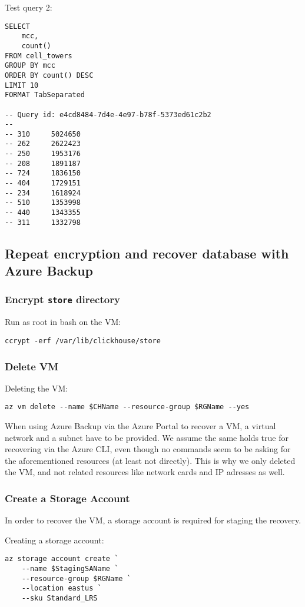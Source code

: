 Test query 2:
\begin{verbatim}
SELECT
    mcc,
    count()
FROM cell_towers
GROUP BY mcc
ORDER BY count() DESC
LIMIT 10
FORMAT TabSeparated

-- Query id: e4cd8484-7d4e-4e97-b78f-5373ed61c2b2
--
-- 310     5024650
-- 262     2622423
-- 250     1953176
-- 208     1891187
-- 724     1836150
-- 404     1729151
-- 234     1618924
-- 510     1353998
-- 440     1343355
-- 311     1332798
\end{verbatim}

\subsection{Repeat encryption and recover database with Azure Backup}
\label{sec:org2f39a38}
\subsubsection{Encrypt \texttt{store} directory}
\label{sec:org53cf4ea}
Run as root in bash on the VM:
\begin{verbatim}
ccrypt -erf /var/lib/clickhouse/store
\end{verbatim}
\subsubsection{Delete VM}
\label{sec:org3c61e5e}
Deleting the VM:
\begin{verbatim}
az vm delete --name $CHName --resource-group $RGName --yes
\end{verbatim}

When using Azure Backup via the Azure Portal to recover a VM,
a virtual network and a subnet have to be provided.
We assume the same holds true for recovering via the Azure CLI,
even though no commands seem to be asking for the aforementioned resources (at least not directly).
This is why we only deleted the VM, and not related resources like network cards and IP adresses as well.

\subsubsection{Create a Storage Account}
\label{sec:orgab49f59}
In order to recover the VM, a storage account is required for staging the recovery.

Creating a storage account:
\begin{verbatim}
az storage account create `
    --name $StagingSAName `
    --resource-group $RGName `
    --location eastus `
    --sku Standard_LRS
\end{verbatim}

